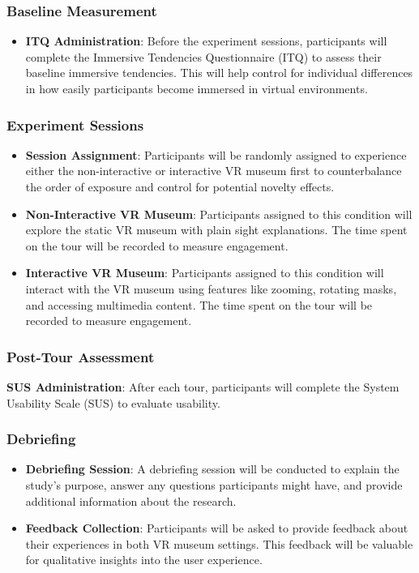 \documentclass[conference]{IEEEtran}
\begin{document}
\subsubsection{Baseline Measurement}
\begin{itemize}
    \item \textbf{ITQ Administration}: Before the experiment sessions, participants will complete the Immersive Tendencies Questionnaire (ITQ) to assess their baseline immersive tendencies. This will help control for individual differences in how easily participants become immersed in virtual environments.
\end{itemize}
\subsubsection{Experiment Sessions}
\begin{itemize}
    \item \textbf{Session Assignment}: Participants will be randomly assigned to experience either the non-interactive or interactive VR museum first to counterbalance the order of exposure and control for potential novelty effects.
    \item \textbf{Non-Interactive VR Museum}: Participants assigned to this condition will explore the static VR museum with plain sight explanations. The time spent on the tour will be recorded to measure engagement.
    \item \textbf{Interactive VR Museum}: Participants assigned to this condition will interact with the VR museum using features like zooming, rotating masks, and accessing multimedia content. The time spent on the tour will be recorded to measure engagement.
\end{itemize}
\subsubsection{Post-Tour Assessment}
\begin{itemize}
\textbf{SUS Administration}: After each tour, participants will complete the System Usability Scale (SUS) to evaluate usability.
\end{itemize}
\subsubsection{Debriefing}
\begin{itemize}
    \item \textbf{Debriefing Session}: A debriefing session will be conducted to explain the study's purpose, answer any questions participants might have, and provide additional information about the research.
    \item \textbf{Feedback Collection}: Participants will be asked to provide feedback about their experiences in both VR museum settings. This feedback will be valuable for qualitative insights into the user experience.
\end{itemize}
\end{document}
